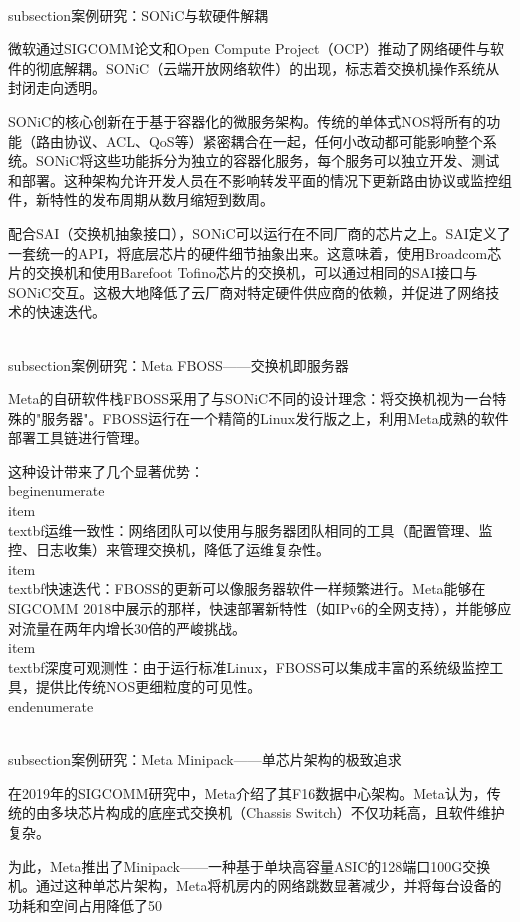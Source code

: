 \\subsection{案例研究：SONiC与软硬件解耦}

微软通过SIGCOMM论文和Open Compute Project（OCP）推动了网络硬件与软件的彻底解耦。SONiC（云端开放网络软件）的出现，标志着交换机操作系统从封闭走向透明。

SONiC的核心创新在于基于容器化的微服务架构。传统的单体式NOS将所有的功能（路由协议、ACL、QoS等）紧密耦合在一起，任何小改动都可能影响整个系统。SONiC将这些功能拆分为独立的容器化服务，每个服务可以独立开发、测试和部署。这种架构允许开发人员在不影响转发平面的情况下更新路由协议或监控组件，新特性的发布周期从数月缩短到数周。

配合SAI（交换机抽象接口），SONiC可以运行在不同厂商的芯片之上。SAI定义了一套统一的API，将底层芯片的硬件细节抽象出来。这意味着，使用Broadcom芯片的交换机和使用Barefoot Tofino芯片的交换机，可以通过相同的SAI接口与SONiC交互。这极大地降低了云厂商对特定硬件供应商的依赖，并促进了网络技术的快速迭代。

\\subsection{案例研究：Meta FBOSS——交换机即服务器}

Meta的自研软件栈FBOSS采用了与SONiC不同的设计理念：将交换机视为一台特殊的"服务器"。FBOSS运行在一个精简的Linux发行版之上，利用Meta成熟的软件部署工具链进行管理。

这种设计带来了几个显著优势：
\\begin{enumerate}
    \\item \\textbf{运维一致性}：网络团队可以使用与服务器团队相同的工具（配置管理、监控、日志收集）来管理交换机，降低了运维复杂性。
    \\item \\textbf{快速迭代}：FBOSS的更新可以像服务器软件一样频繁进行。Meta能够在SIGCOMM 2018中展示的那样，快速部署新特性（如IPv6的全网支持），并能够应对流量在两年内增长30倍的严峻挑战。
    \\item \\textbf{深度可观测性}：由于运行标准Linux，FBOSS可以集成丰富的系统级监控工具，提供比传统NOS更细粒度的可见性。
\\end{enumerate}

\\subsection{案例研究：Meta Minipack——单芯片架构的极致追求}

在2019年的SIGCOMM研究中，Meta介绍了其F16数据中心架构。Meta认为，传统的由多块芯片构成的底座式交换机（Chassis Switch）不仅功耗高，且软件维护复杂。

为此，Meta推出了Minipack——一种基于单块高容量ASIC的128端口100G交换机。通过这种单芯片架构，Meta将机房内的网络跳数显著减少，并将每台设备的功耗和空间占用降低了50\\%

